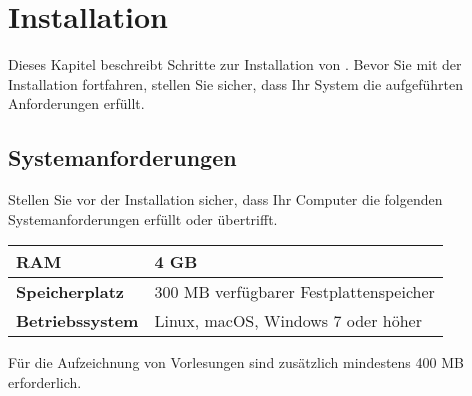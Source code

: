 \chapter{Installation}
\label{section:installation}
Dieses Kapitel beschreibt Schritte zur Installation von \lectStudio{}. Bevor Sie mit der Installation fortfahren, stellen Sie sicher, dass Ihr System die aufgeführten Anforderungen erfüllt.

\section{Systemanforderungen}
Stellen Sie vor der Installation sicher, dass Ihr Computer die folgenden Systemanforderungen erfüllt oder übertrifft.

\vspace{1em}
\begin{tabularx}{\textwidth}{l|l}
	\textbf{RAM} & 4 GB \\ \hline
	\textbf{Speicherplatz} & 300 MB verfügbarer Festplattenspeicher \\ \hline
	\textbf{Betriebssystem} & Linux, macOS, Windows 7 oder höher
\end{tabularx}
\vspace{1em}

\begin{info}
	Für die Aufzeichnung von Vorlesungen sind zusätzlich mindestens 400 MB erforderlich.
\end{info}

